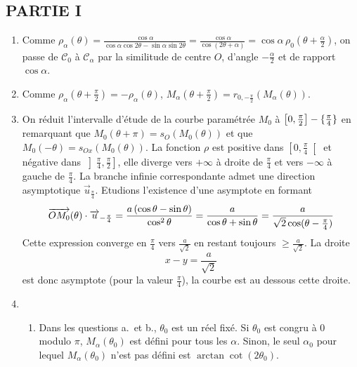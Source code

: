 \subsection*{PARTIE I}

\begin{enumerate}
\item  Comme $\rho _{\alpha }(\theta )=\frac{\cos \alpha }{\cos \alpha \cos
2\theta -\sin \alpha \sin 2\theta }=\frac{\cos \alpha }{\cos (2\theta
+\alpha )}=\cos \alpha \,\rho _{0}(\theta +\frac{\alpha }{2})$, on passe de $%
\mathcal{C}_{0}$ \`{a} $\mathcal{C}_{\alpha }$ par la similitude de centre $O
$, d'angle $-\frac{\alpha }{2}$ et de rapport $\cos \alpha $.

\item  Comme $\rho _{\alpha }(\theta +\frac{\pi }{2})=-\rho _{\alpha
}(\theta )$, $M_{\alpha }(\theta +\frac{\pi }{2})=r_{0,-\frac{\pi }{2}%
}(M_{\alpha }(\theta ))$.

\item  On r\'{e}duit l'intervalle d'\'{e}tude de la courbe
param\'{e}tr\'{e}e $M_{0}$ \`{a} $\left[ 0,\frac{\pi }{2}\right] -\{\frac{%
\pi }{4}\}$ en remarquant que $M_{0}(\theta +\pi )=s_{O}(M_{0}(\theta ))$ et
que $M_{0}(-\theta )=s_{Ox}(M_{0}(\theta )).$\newline
La fonction $\rho $ est positive dans $\left[ 0,\frac{\pi }{4}\right[ $ et
n\'{e}gative dans $\left] \frac{\pi }{4},\frac{\pi }{2}\right] $, elle
diverge vers $+\infty $ \`{a} droite de $\frac{\pi }{4}$ et vers $-\infty $
\`{a} gauche de $\frac{\pi }{4}$. La branche infinie correspondante admet
une direction asymptotique $\overrightarrow{u}_{\frac{\pi }{4}}$. Etudions
l'existence d'une asymptote en formant 
\[
\overrightarrow{OM_{0}}(\theta )\cdot \overrightarrow{u}_{-\frac{\pi }{4}}=%
\frac{a\left( \cos \theta -\sin \theta \right) }{\cos ^{2}\theta }=\frac{a}{%
\cos \theta +\sin \theta }=\frac{a}{\sqrt{2}\cos (\theta -\frac{\pi }{4})}
\]
Cette expression converge en $\frac{\pi }{4}$ vers $\frac{a}{\sqrt{2}}$ en
restant toujours $\geq \frac{a}{\sqrt{2}}$. La droite 
\[
x-y=\frac{a}{\sqrt{2}}
\]
est donc asymptote (pour la valeur $\frac{\pi }{4}$), la courbe est au
dessous cette droite.

\item 
\begin{enumerate}
\item  Dans les questions a.\ et b., $\theta _{0}$ est un r\'{e}el fix\'{e}.
Si $\theta _{0}$ est congru \`{a} 0 modulo $\pi $, $M_{\alpha }(\theta _{0})$
est d\'{e}fini pour tous les $\alpha $. Sinon, le seul $\alpha _{0}$ pour
lequel $M_{\alpha }(\theta _{0})$ n'est pas d\'{e}fini est $\arctan \cot
(2\theta _{0})$.


\end{enumerate}
\end{enumerate}
